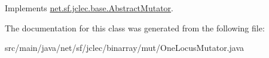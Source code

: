 Implements \hyperlink{classnet_1_1sf_1_1jclec_1_1base_1_1_abstract_mutator_acad18bae2458fe06812b321d43f3499e}{net.\-sf.\-jclec.\-base.\-Abstract\-Mutator}.



The documentation for this class was generated from the following file\-:\begin{DoxyCompactItemize}
\item 
src/main/java/net/sf/jclec/binarray/mut/One\-Locus\-Mutator.\-java\end{DoxyCompactItemize}
